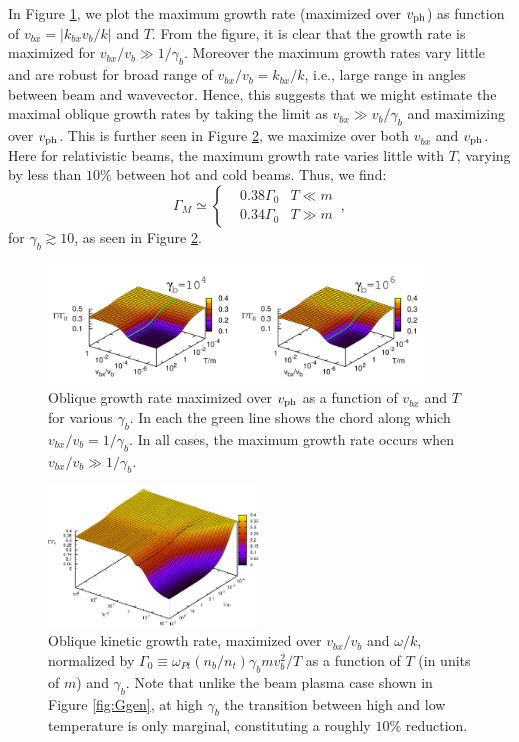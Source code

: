 \documentclass[usenatbib,iop,apj,numberedappendix]{aeb_emulateapj_2010}
\def\vph{v_{\rm ph}}
\begin{document}
In Figure \ref{fig:ObliqueGMZ}, we plot the maximum growth rate (maximized over $\vph$) as function of $v_{bx} = |k_{bx} v_b/k|$ and $T$.  From the figure, it is clear that the growth rate is maximized for $v_{bx}/v_b \gg 1/\gamma_b$.  Moreover the maximum growth rates vary little and are robust for broad range of $v_{bx}/v_b = k_{bx}/k$, i.e., large range in angles between beam and wavevector.  Hence, this suggests that we might estimate the maximal oblique growth rates by taking the limit as $v_{bx}\gg v_b/\gamma_b$ and maximizing over $\vph$.  This is further seen in Figure \ref{fig:OGgen}, we maximize over both $v_{bx}$ and $\vph$.  Here for relativistic beams, the maximum growth rate varies little with $T$, varying by less than $10\%$ between hot and cold beams.  Thus, we find: 
\begin{equation}
\Gamma_M
\simeq
\left\{
\begin{aligned}
& 0.38 \Gamma_0 & T\ll m\\
& 0.34 \Gamma_0 & T\gg m
\end{aligned}
\right.\,,
\end{equation}
for $\gamma_b\gtrsim10$, as seen in Figure \ref{fig:OGgen}.  

\begin{figure}
\includegraphics[width=0.9\textwidth]{growthrates.png}
\caption{Oblique growth rate maximized over $\vph$ as a function of
  $v_{bx}$ and $T$ for various $\gamma_b$.  In each the green line
  shows the chord along which $v_{bx}/v_b = 1/\gamma_b$.  In all
  cases, the maximum growth rate occurs when
  $v_{bx}/v_b\gg1/\gamma_b$.}\label{fig:ObliqueGMZ}
\end{figure}


\begin{figure}
\includegraphics[width=0.5\textwidth]{oblique_GammaM.eps}
\caption{Oblique kinetic growth rate, maximized over $v_{bx}/v_b$ and
  $\omega/k$, normalized by
  $\Gamma_0\equiv\omega_{Pt}(n_b/n_t)\gamma_b m v_b^2/T$ as a function
  of $T$ (in units of $m$) and $\gamma_b$.  Note that unlike the beam
  plasma case shown in Figure \ref{fig:Ggen}, at high $\gamma_b$ the
  transition between high and low temperature is only marginal,
  constituting a roughly $10\%$ reduction.} \label{fig:OGgen}
\end{figure}
\end{document}
